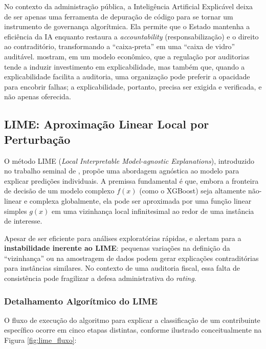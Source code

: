No contexto da administração pública, a Inteligência Artificial Explicável deixa de ser apenas uma ferramenta de depuração de código para se tornar um instrumento de governança algorítmica. Ela permite que o Estado mantenha a eficiência da IA enquanto restaura a \textit{accountability} (responsabilização) e o direito ao contraditório, transformando a ``caixa-preta'' em uma ``caixa de vidro'' auditável.  mostram, em um modelo econômico, que a regulação por auditorias tende a induzir investimento em explicabilidade, mas também que, quando a explicabilidade facilita a auditoria, uma organização pode preferir a opacidade para encobrir falhas; a explicabilidade, portanto, precisa ser exigida e verificada, e não apenas oferecida.

\subsection{LIME: Aproximação Linear Local por Perturbação}
\label{subsec:lime}

O método LIME (\textit{Local Interpretable Model-agnostic Explanations}), introduzido no trabalho seminal de , propõe uma abordagem agnóstica ao modelo para explicar predições individuais. A premissa fundamental é que, embora a fronteira de decisão de um modelo complexo $f(x)$ (como o XGBoost) seja altamente não-linear e complexa globalmente, ela pode ser aproximada por uma função linear simples $g(x)$ em uma vizinhança local infinitesimal ao redor de uma instância de interesse. 

Apesar de ser eficiente para análises exploratórias rápidas,  e  alertam para a \textbf{instabilidade inerente ao LIME}: pequenas variações na definição da ``vizinhança'' ou na amostragem de dados podem gerar explicações contraditórias para instâncias similares. No contexto de uma auditoria fiscal, essa falta de consistência pode fragilizar a defesa administrativa do \textit{rating}.

\subsubsection{Detalhamento Algorítmico do LIME}

O fluxo de execução do algoritmo para explicar a classificação de um contribuinte específico ocorre em cinco etapas distintas, conforme ilustrado conceitualmente na Figura \ref{fig:lime_fluxo}:

